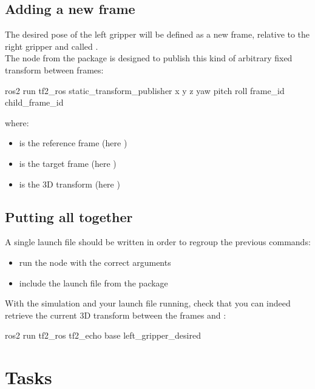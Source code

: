 \documentclass{ecnreport}
\begin{document}
\subsection{Adding a new frame}

The desired pose of the left gripper will be defined as a new frame, relative to the right gripper and called .\\
The node  from the  package is designed to publish this kind of arbitrary fixed transform between frames:
\begin{bashcodelarge}
 ros2 run tf2_ros static_transform_publisher x y z yaw pitch roll frame_id child_frame_id
\end{bashcodelarge}where:
\begin{itemize}
\item {} is the reference frame (here )
\item {} is the target frame (here )
 \item {} is the 3D transform (here )
\end{itemize}

\subsection{Putting all together}

A single launch file should be written in order to regroup the previous commands:
\begin{itemize}
 \item run the node  with the correct arguments
 \item include the launch file  from the  package
 \end{itemize}
 
 With the simulation and your launch file running, check that you can indeed retrieve the current 3D transform between the frames  and :
 \begin{bashcodelarge}
 ros2 run tf2_ros tf2_echo base left_gripper_desired
\end{bashcodelarge}

\section{Tasks}
\end{document}

